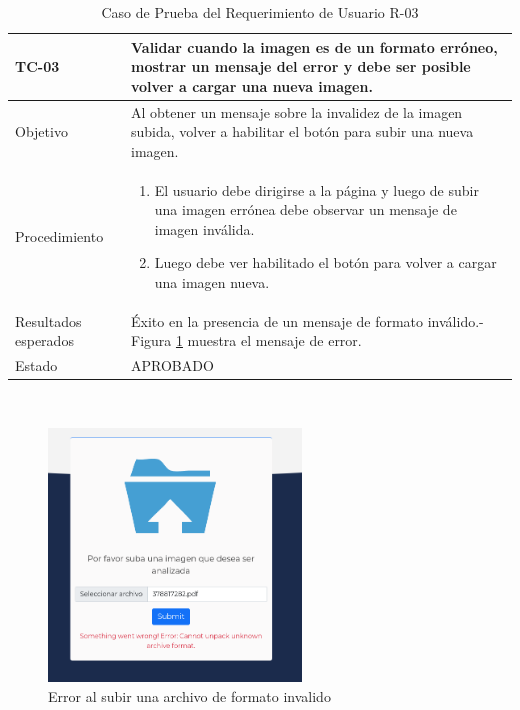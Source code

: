 \begin{table}[h!]
    \begin{tabular}{ | p{3cm} |p{9cm}| }
        \hline
        \rowcolor[HTML]{d6d8ff}
        TC-03 & Validar cuando la imagen es de un formato erróneo, mostrar un mensaje del error y debe ser posible volver a cargar una nueva imagen.\\
        \hline
        Objetivo & Al obtener un mensaje sobre la invalidez de la imagen subida, volver a habilitar el botón para subir una nueva imagen.\\
        \hline
        Procedimiento & \begin{enumerate}
            \item El usuario debe dirigirse a la página y luego de subir una imagen errónea debe  observar un mensaje de imagen inválida.
            \item Luego debe ver habilitado el botón para volver a cargar una imagen nueva. 
        \end{enumerate}
        \\
        \hline
        Resultados esperados & Éxito en la presencia de un mensaje de formato inválido.- Figura \ref{fig:error1} muestra el mensaje de error. \\
        \hline
        Estado & APROBADO \\
        \hline
    \end{tabular}\\
    \caption{Caso de Prueba del Requerimiento de Usuario R-03}
    \label{pruebar3}
\end{table}

\begin{figure}[h!]
    \centering
    \includegraphics[width=0.6\textwidth]{img/FE - upload error.png} 
    \caption{Error al subir una archivo de formato invalido}
    \label{fig:error1}
\end{figure}


